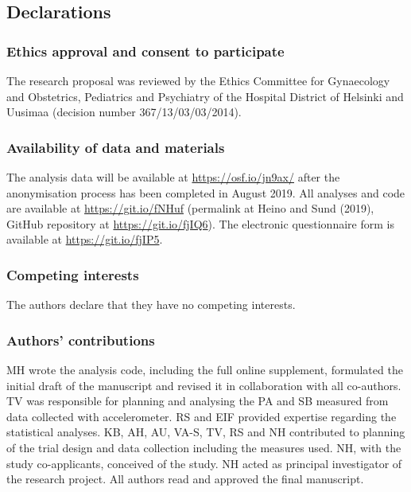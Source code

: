 \documentclass[british,man]{apa6}
\begin{document}
\hypertarget{declarations}{%
\subsection{Declarations}\label{declarations}}

\hypertarget{ethics-approval-and-consent-to-participate}{%
\subsubsection{Ethics approval and consent to participate}\label{ethics-approval-and-consent-to-participate}}

The research proposal was reviewed by the Ethics Committee for Gynaecology and Obstetrics, Pediatrics and Psychiatry of the Hospital District of Helsinki and Uusimaa (decision number 367/13/03/03/2014).

\hypertarget{availability-of-data-and-materials}{%
\subsubsection{Availability of data and materials}\label{availability-of-data-and-materials}}

The analysis data will be available at \url{https://osf.io/jn9ax/} after the anonymisation process has been completed in August 2019. All analyses and code are available at \url{https://git.io/fNHuf} (permalink at Heino and Sund (2019), GitHub repository at \url{https://git.io/fjIQ6}). The electronic questionnaire form is available at \url{https://git.io/fjIP5}.

\hypertarget{competing-interests}{%
\subsubsection{Competing interests}\label{competing-interests}}

The authors declare that they have no competing interests.

\hypertarget{authors-contributions}{%
\subsubsection{Authors' contributions}\label{authors-contributions}}

MH wrote the analysis code, including the full online supplement, formulated the initial draft of the manuscript and revised it in collaboration with all co-authors. TV was responsible for planning and analysing the PA and SB measured from data collected with accelerometer. RS and EIF provided expertise regarding the statistical analyses. KB, AH, AU, VA-S, TV, RS and NH contributed to planning of the trial design and data collection including the measures used. NH, with the study co-applicants, conceived of the study. NH acted as principal investigator of the research project. All authors read and approved the final manuscript.
\end{document}

